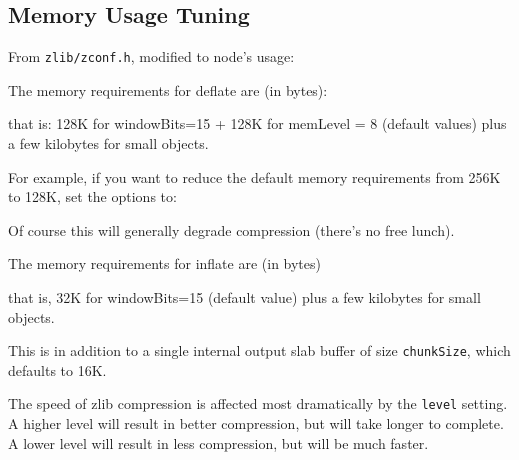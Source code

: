 \subsection{Memory Usage Tuning}

From \texttt{zlib/zconf.h}, modified to node's usage:

The memory requirements for deflate are (in bytes):

\begin{Shaded}
\begin{Highlighting}[]
\NormalTok{(} \NormalTok{)) +  (} \NormalTok{))}
\end{Highlighting}
\end{Shaded}

that is: 128K for windowBits=15 + 128K for memLevel = 8 (default values)
plus a few kilobytes for small objects.

For example, if you want to reduce the default memory requirements from
256K to 128K, set the options to:

\begin{Shaded}
\begin{Highlighting}[]
\NormalTok{\{ }\NormalTok{: }\NormalTok{, }\NormalTok{: } \NormalTok{\}}
\end{Highlighting}
\end{Shaded}

Of course this will generally degrade compression (there's no free
lunch).

The memory requirements for inflate are (in bytes)

\begin{Shaded}
\begin{Highlighting}[]
 
\end{Highlighting}
\end{Shaded}

that is, 32K for windowBits=15 (default value) plus a few kilobytes for
small objects.

This is in addition to a single internal output slab buffer of size
\texttt{chunkSize}, which defaults to 16K.

The speed of zlib compression is affected most dramatically by the
\texttt{level} setting. A higher level will result in better
compression, but will take longer to complete. A lower level will result
in less compression, but will be much faster.

